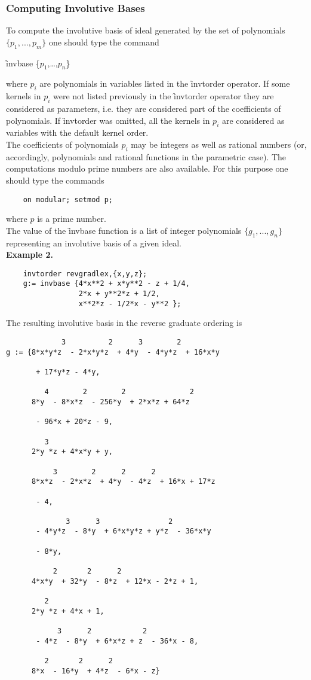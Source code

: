 \subsubsection{Computing Involutive Bases}
\hypertarget{operator:INVBASE}{}
To compute the involutive basis of ideal generated by the set of
polynomials $\{p_1,...,p_m\}$ one should type the command
\begin{syntax}
  \f{invbase} \{$p_{1}$,\ldots,$p_{n}$\}
\end{syntax}
where $p_i$ are polynomials in variables listed in the
\f{invtorder} operator. If some kernels in $p_i$ were not listed
previously in the \f{invtorder} operator they are considered as
parameters, i.e. they are considered part of the coefficients of
polynomials. If \f{invtorder} was omitted, all the kernels
in $p_i$ are considered as variables with the default \REDUCE
kernel order.\\
The coefficients of polynomials $p_i$ may be integers as well as
rational numbers (or, accordingly, polynomials and rational functions
in the parametric case). The computations modulo prime numbers are
also available. For this purpose one should type the \REDUCE commands
\begin{verbatim}
    on modular; setmod p;
\end{verbatim}
where $p$ is a prime number.\\
The value of the \f{invbase} function is a list of integer polynomials
$\{g_1,...,g_n\}$ representing an involutive basis of a given ideal.\\
\textbf{Example 2.}
\begin{verbatim}
    invtorder revgradlex,{x,y,z};
    g:= invbase {4*x**2 + x*y**2 - z + 1/4,
                 2*x + y**2*z + 1/2,
                 x**2*z - 1/2*x - y**2 };
\end{verbatim}
The resulting involutive basis in the reverse graduate ordering is
\begin{verbatim}
             3          2      3        2
g := {8*x*y*z  - 2*x*y*z  + 4*y  - 4*y*z  + 16*x*y

       + 17*y*z - 4*y,

         4        2        2               2
      8*y  - 8*x*z  - 256*y  + 2*x*z + 64*z

       - 96*x + 20*z - 9,

         3
      2*y *z + 4*x*y + y,

           3        2      2      2
      8*x*z  - 2*x*z  + 4*y  - 4*z  + 16*x + 17*z

       - 4,

              3      3                2
       - 4*y*z  - 8*y  + 6*x*y*z + y*z  - 36*x*y

       - 8*y,

           2       2      2
      4*x*y  + 32*y  - 8*z  + 12*x - 2*z + 1,

         2
      2*y *z + 4*x + 1,

            3      2            2
       - 4*z  - 8*y  + 6*x*z + z  - 36*x - 8,

         2       2      2
      8*x  - 16*y  + 4*z  - 6*x - z}
\end{verbatim}
